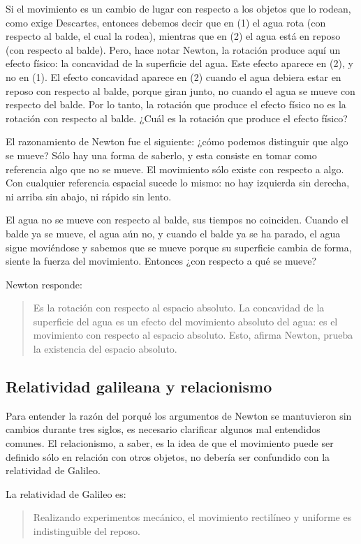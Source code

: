 \documentclass[../apunte_mecanica_clasica.tex]{subfiles}%
\begin{document}
Si el movimiento es un cambio de lugar con respecto a los objetos que lo rodean, como exige Descartes, entonces debemos decir que en (1) el agua rota (con respecto al balde, el cual la rodea), mientras que en (2) el agua está en reposo (con respecto al balde). Pero, hace notar Newton, la rotación produce aquí un efecto físico: la concavidad de la superficie del agua. Este efecto aparece en (2), y no en (1). El efecto concavidad aparece en (2) cuando el agua debiera estar en reposo con respecto al balde, porque giran junto, no cuando el agua se mueve con respecto del balde. Por lo tanto, la rotación que produce el efecto físico no es la rotación con respecto al balde. ¿Cuál es la rotación que produce el efecto físico?

El razonamiento de Newton fue el siguiente: ¿cómo podemos distinguir que algo se mueve? Sólo hay una forma de saberlo, y esta consiste en tomar como referencia algo que no se mueve. El movimiento sólo existe con respecto a algo. Con cualquier referencia espacial sucede lo mismo: no hay izquierda sin derecha, ni arriba sin abajo, ni rápido sin lento.

El agua no se mueve con respecto al balde, sus tiempos no coinciden. Cuando el balde ya se mueve, el agua aún no, y cuando el balde ya se ha parado, el agua sigue moviéndose y sabemos que se mueve porque su superficie cambia de forma, siente la fuerza del movimiento. Entonces ¿con respecto a qué se mueve?

Newton responde:
\begin{quote}
Es la rotación con respecto al espacio absoluto. La concavidad de la superficie del agua es un efecto del movimiento absoluto del agua: es el movimiento con respecto al espacio absoluto. Esto, afirma Newton, prueba la existencia del espacio absoluto.
\end{quote}

\subsection{Relatividad galileana y relacionismo}

Para entender la razón del porqué los argumentos de Newton se mantuvieron sin cambios durante tres siglos, es necesario clarificar algunos mal entendidos comunes. El relacionismo, a saber, es la idea de que el movimiento puede ser definido sólo en relación con otros objetos, no debería ser confundido con la relatividad de Galileo.

La relatividad de Galileo es:
\begin{quote}
Realizando experimentos mecánico, el movimiento rectilíneo y uniforme es indistinguible del reposo.
\end{quote}
\end{document}
